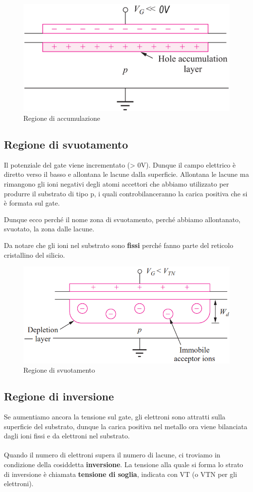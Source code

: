 \begin{figure}[htbp]
    \centering
    \includegraphics[width=0.4\linewidth]{img/polarizza_neg.png}  
    \caption{Regione	di	accumulazione}   
\end{figure}

\newpage
\subsection{Regione	di	svuotamento}
Il	potenziale	del	gate	viene	incrementato	(>	0V). Dunque il campo elettrico è diretto verso il basso e allontana le lacune dalla superficie. Allontana le lacune ma rimangono gli ioni negativi degli atomi accettori che abbiamo utilizzato per produrre il substrato di tipo p, i quali controbilanceranno la carica positiva che si è formata sul gate.

Dunque ecco perché il nome zona di svuotamento, perché abbiamo allontanato, svuotato, la zona dalle lacune.

Da notare che gli ioni nel substrato sono \textbf{fissi} perché fanno parte del reticolo cristallino del silicio.

\begin{figure}[htbp]
    \centering
    \includegraphics[width=0.47\linewidth]{img/regione_svuotmamnto.png}
    \caption{Regione	di	svuotamento}    
\end{figure}

\subsection{Regione	di	inversione}
Se aumentiamo ancora la tensione sul gate, gli elettroni sono attratti sulla superficie del substrato, dunque la carica positiva nel metallo ora viene bilanciata dagli ioni fissi e da elettroni nel substrato.
\paragraph{}
Quando il numero di elettroni supera il numero di lacune, ci troviamo in condizione della cosiddetta \textbf{inversione}. La tensione alla quale si forma lo strato	di	inversione	è	chiamata	
\textbf{tensione	di	soglia},	indicata	con	VT (o	VTN per	gli	elettroni).



